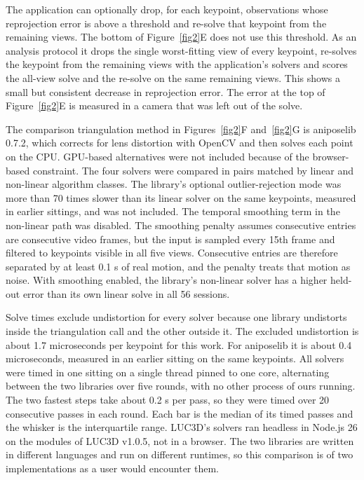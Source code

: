 \documentclass[pdflatex, sn-nature]{sn-jnl}
\theoremstyle{thmstyleone}%
\theoremstyle{thmstyletwo}%
\theoremstyle{thmstylethree}%
\begin{document}
The application can optionally drop, for each keypoint, observations whose reprojection error is above a threshold and re-solve that keypoint from the remaining views. The bottom of Figure~\ref{fig2}E does not use this threshold. As an analysis protocol it drops the single worst-fitting view of every keypoint, re-solves the keypoint from the remaining views with the application's solvers and scores the all-view solve and the re-solve on the same remaining views. This shows a small but consistent decrease in reprojection error. The error at the top of Figure~\ref{fig2}E is measured in a camera that was left out of the solve.

The comparison triangulation method in Figures~\ref{fig2}F and~\ref{fig2}G is aniposelib 0.7.2, which corrects for lens distortion with OpenCV and then solves each point on the CPU. GPU-based alternatives were not included because of the browser-based constraint. The four solvers were compared in pairs matched by linear and non-linear algorithm classes. The library's optional outlier-rejection mode was more than 70 times slower than its linear solver on the same keypoints, measured in earlier sittings, and was not included. The temporal smoothing term in the non-linear path was disabled. The smoothing penalty assumes consecutive entries are consecutive video frames, but the input is sampled every 15th frame and filtered to keypoints visible in all five views. Consecutive entries are therefore separated by at least 0.1 s of real motion, and the penalty treats that motion as noise. With smoothing enabled, the library's non-linear solver has a higher held-out error than its own linear solve in all 56 sessions. 

Solve times exclude undistortion for every solver because one library undistorts inside the triangulation call and the other outside it. The excluded undistortion is about 1.7 microseconds per keypoint for this work. For aniposelib it is about 0.4 microseconds, measured in an earlier sitting on the same keypoints. All solvers were timed in one sitting on a single thread pinned to one core, alternating between the two libraries over five rounds, with no other process of ours running. The two fastest steps take about 0.2 s per pass, so they were timed over 20 consecutive passes in each round. Each bar is the median of its timed passes and the whisker is the interquartile range. LUC3D's solvers ran headless in Node.js 26 on the modules of LUC3D v1.0.5, not in a browser. The two libraries are written in different languages and run on different runtimes, so this comparison is of two implementations as a user would encounter them. 
\end{document}
